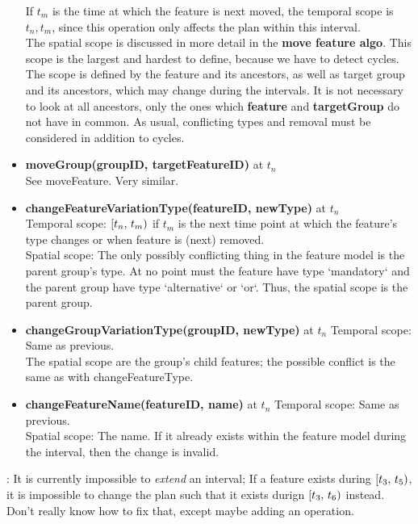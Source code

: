\begin{itemize}
  If $t_m$ is the time at which the feature is next moved, the temporal scope is $t_n, t_m$, since this operation only affects the plan within this interval.\\
  The spatial scope is discussed in more detail in the \textbf{move feature algo}. This scope is the largest and hardest to define, because we have to detect cycles. The scope is defined by the feature and its ancestors, as well as target group and its ancestors, which may change during the intervals. It is not necessary to look at all ancestors, only the ones which \textbf{feature} and \textbf{targetGroup} do not have in common. As usual, conflicting types and removal must be considered in addition to cycles.
  \item \textbf{moveGroup(groupID, targetFeatureID)} at $t_n$\\
    See moveFeature. Very similar.
  \item \textbf{changeFeatureVariationType(featureID, newType)} at $t_n$\\
    Temporal scope: $[t_n,\, t_m)$ if $t_m$ is the next time point at which the feature's type changes or when feature is (next) removed.\\
    Spatial scope: The only possibly conflicting thing in the feature model is the parent group's type. At no point must the feature have type `mandatory` and the parent group have type `alternative` or `or`. Thus, the spatial scope is the parent group.\\
  \item \textbf{changeGroupVariationType(groupID, newType)} at $t_n$
    Temporal scope: Same as previous.\\
    The spatial scope are the group's child features; the possible conflict is the same as with changeFeatureType.\\
  \item \textbf{changeFeatureName(featureID, name)} at $t_n$
    Temporal scope: Same as previous.\\
    Spatial scope: The name. If it already exists within the feature model during the interval, then the change is invalid. 
\end{itemize}

: It is currently impossible to \emph{extend} an interval; If a feature exists during $[t_3,\, t_5)$, it is impossible to change the plan such that it exists durign $[t_3,\, t_6)$ instead. Don't really know how to fix that, except maybe adding an operation. 
